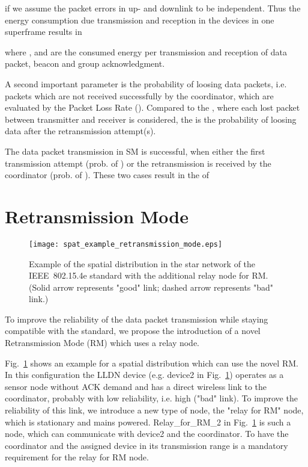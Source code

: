 \documentclass[times,10pt,twocolumn]{article}
\begin{document}
if we assume the packet errors in up- and downlink to be independent.
Thus the energy consumption due transmission and reception in the devices in one superframe results in

where ,  and  are the consumed energy per transmission and reception of data packet, beacon and group acknowledgment.

A second important parameter is the probability of loosing data packets, i.e. packets which are not received successfully by the coordinator, which are evaluated by the Packet Loss Rate (). Compared to the , where each lost packet between transmitter and receiver is considered, the  is the probability of loosing data after the retransmission attempt(s).

The data packet transmission in SM is successful, when either the first transmission attempt (prob. of ) or the retransmission is received by the coordinator (prob. of ). These two cases result in the  of\\



\section{Retransmission Mode}
\label{section_retransmission_mode}
\begin{figure}[!h]
\centering
\texttt{[image: spat\_example\_retransmission\_mode.eps]}
\caption{Example of the spatial distribution in the star network of the IEEE~802.15.4e standard with the additional relay node for RM. (Solid arrow represents "good" link; dashed arrow represents "bad" link.)}
    \label{fig_spat_distr_retransmission_proposal}
\end{figure}


To improve the reliability of the data packet transmission while staying compatible with the standard, we propose the introduction of a novel Retransmission Mode (RM) which uses a relay node.

Fig.~\ref{fig_spat_distr_retransmission_proposal} shows an example for a spatial distribution which can use the novel RM. In this configuration the LLDN device (e.g. device2 in Fig.~\ref{fig_spat_distr_retransmission_proposal}) operates as a sensor node without ACK demand and has a direct wireless link to the coordinator, probably with low reliability, i.e. high  ("bad" link). To improve the reliability of this link, we introduce a new type of node, the "relay for RM" node, which is stationary and mains powered. Relay\_for\_RM\_2 in Fig.~\ref{fig_spat_distr_retransmission_proposal} is such a node, which can communicate with device2 and the coordinator. To have the coordinator and the assigned device in its transmission range is a mandatory requirement for the relay for RM node.
\end{document}
